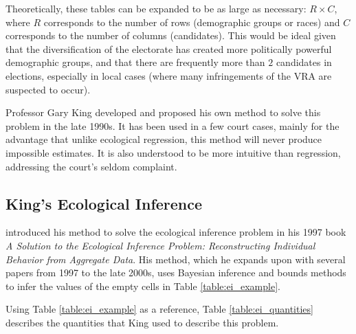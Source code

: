 Theoretically, these tables can be expanded to be as large as necessary: $R \times C$, where $R$ corresponds to the number of rows (demographic groups or races) and $C$ corresponds to the number of columns (candidates). This would be ideal given that the diversification of the electorate has created more politically powerful demographic groups, and that there are frequently more than $2$ candidates in elections, especially in local cases (where many infringements of the VRA are suspected to occur).

Professor Gary King developed and proposed his own method to solve this problem in the late 1990s. It has been used in a few court cases, mainly for the advantage that unlike ecological regression, this method will never produce impossible estimates. It is also understood to be more intuitive than regression, addressing the court's seldom complaint.

\subsection{King's Ecological Inference}

 introduced his method to solve the ecological inference problem in his 1997 book \textit{A Solution to the Ecological Inference Problem: Reconstructing Individual Behavior from Aggregate Data}.\cite{king1997} His method, which he expands upon with several papers from 1997 to the late 2000s, uses Bayesian inference and bounds methods to infer the values of the empty cells in Table \ref{table:ei_example}.

Using Table \ref{table:ei_example} as a reference, Table \ref{table:ei_quantities} describes the quantities that King used to describe this problem.\cite{king1999}

